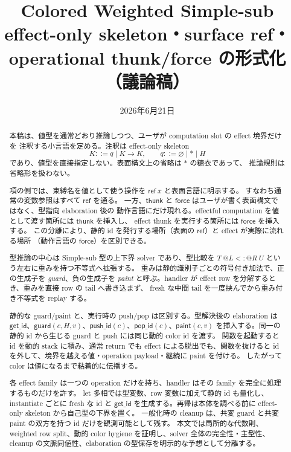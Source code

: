 \documentclass[uplatex,dvipdfmx,a4paper,11pt]{jsarticle}
\title{Colored Weighted Simple-sub\\
\large effect-only skeleton・surface ref・operational thunk/force の形式化（議論稿）}
\author{}
\date{2026年6月21日}
\makeatletter
\theoremstyle{jpplain}
\newcommand{\emptyrow}{\varnothing}
\newcommand{\starann}{\ast}
\newcommand{\wsub}[4]{#1\ @#2\mathrel{<:}@#3\ #4}
\newcommand{\thunk}{\mathsf{thunk}}
\newcommand{\force}{\mathsf{force}}
\newcommand{\getid}{\mathsf{get\_id}}
\newcommand{\pushid}{\mathsf{push\_id}}
\newcommand{\popid}{\mathsf{pop\_id}}
\newcommand{\guard}{\mathsf{guard}}
\newcommand{\paint}{\mathsf{paint}}
\makeatother
\begin{document}
\pagestyle{plain}
\maketitle

\begin{abstract}
本稿は、値型を通常どおり推論しつつ、ユーザが computation slot の effect 境界だけを
注釈する小言語を定める。注釈は effect-only skeleton
\[
  K ::= q \mid K\to K,
  \qquad
  q ::= \emptyrow \mid \starann \mid H
\]
であり、値型を直接指定しない。表面構文上の省略は \(\starann\) の糖衣であって、
推論規則は省略形を扱わない。

項の側では、束縛名を値として使う操作を \(\mathsf{ref}\ x\) と表面言語に明示する。
すなわち通常の変数参照はすべて \(\mathsf{ref}\) を通る。
一方、\(\thunk\) と \(\force\) はユーザが書く表面構文ではなく、型指向 elaboration 後の
動作言語にだけ現れる。effectful computation を値として渡す箇所には \(\thunk\) を挿入し、
effect thunk を実行する箇所には \(\force\) を挿入する。
この分離により、静的 id を発行する場所（表面の \(\mathsf{ref}\)）と effect が実際に流れる場所
（動作言語の \(\force\)）を区別できる。

型推論の中心は Simple-sub 型の上下界 solver であり、型比較を
\(\wsub{T}{L}{R}{U}\) という左右に重みを持つ不等式へ拡張する。
重みは静的識別子ごとの符号付き加法で、正の生成子を \emph{guard}、負の生成子を
\emph{paint} と呼ぶ。handler が effect row を分解するとき、重みを直接 row の tail へ書き込まず、
fresh な中間 tail を一度挟んでから重み付き不等式を replay する。

静的な guard/paint と、実行時の push/pop は区別する。型解決後の elaboration は
\(\getid\)、\(\guard(c,H,v)\)、\(\pushid(c)\)、\(\popid(c)\)、\(\paint(c,v)\)
を挿入する。同一の静的 id から生じる guard と push には同じ動的 color id を渡す。
関数を起動すると id を動的 stack に積み、通常 return でも effect による脱出でも、関数を抜けると
id を外して、境界を越える値・operation payload・継続に paint を付ける。
したがって color は値になるまで粘着的に伝播する。

各 effect family は一つの operation だけを持ち、handler はその family を完全に処理するものだけを許す。
let 多相では型変数、row 変数に加えて静的 id も量化し、instantiate ごとに fresh な id と
\(\getid\) を生成する。再帰は本体を調べる前に effect-only skeleton から自己型の下界を置く。
一般化時の cleanup は、共変 guard と共変 paint の双方を持つ id だけを観測可能として残す。
本文では局所的な代数則、weighted row split、動的 color hygiene を証明し、solver 全体の完全性・主型性、
cleanup の文脈同値性、elaboration の型保存を明示的な予想として分離する。
\end{abstract}
\end{document}

